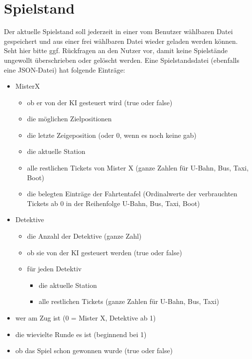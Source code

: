     \section{Spielstand}\label{spielstand}
        Der aktuelle Spielstand soll jederzeit in einer vom Benutzer wählbaren Datei gespeichert und aus einer frei wählbaren Datei wieder geladen werden können. Seht hier bitte ggf. Rückfragen an den Nutzer vor, damit keine Spielstände ungewollt überschrieben oder gelöscht werden.
        \newline
        \newline
        Eine Spielstandsdatei (ebenfalls eine JSON-Datei) hat folgende Einträge:
        \begin{itemize}
            \item MisterX
                \begin{itemize}
                    \item ob er von der KI gesteuert wird (true oder false)
                    \item die möglichen Zielpositionen 
                    \item die letzte Zeigeposition (oder 0, wenn es noch keine gab)
                    \item die aktuelle Station
                    \item alle restlichen Tickets von Mister X (ganze Zahlen für U-Bahn, Bus, Taxi, Boot)
                    \item die belegten Einträge der Fahrtentafel (Ordinalwerte der verbrauchten Tickets ab 0 in der Reihenfolge U-Bahn, Bus, Taxi, Boot)
                \end{itemize}
            \item Detektive
                \begin{itemize}
                    \item die Anzahl der Detektive (ganze Zahl)
                    \item ob sie von der KI gesteuert werden (true oder false)
                    \item für jeden Detektiv
                    \begin{itemize}
                        \item die aktuelle Station
                        \item alle restlichen Tickets (ganze Zahlen für U-Bahn, Bus, Taxi)
                    \end{itemize}
                \end{itemize}
            \item wer am Zug ist (0 = Mister X, Detektive ab 1)
            \item die wievielte Runde es ist (beginnend bei 1)
            \item ob das Spiel schon gewonnen wurde (true oder false)
        \end{itemize}
